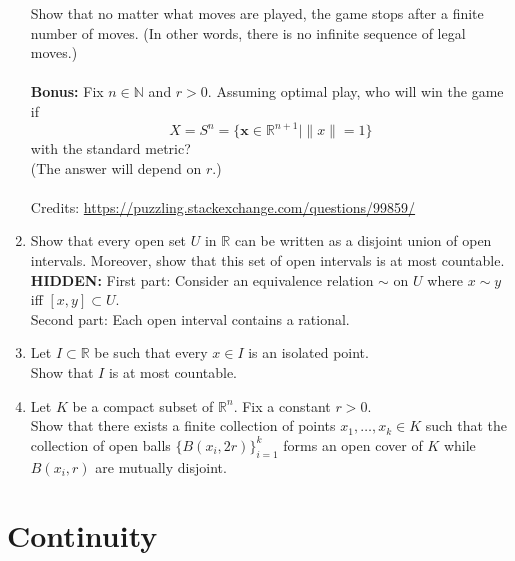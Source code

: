 \documentclass[12pt]{article}
\theoremstyle{definition}
\numberwithin{thm}{section}
\newcommand{\hint}[1]{\textbf{HIDDEN:} {\color[rgb]{0.95, 0.95, 0.95}#1}}
\begin{document}
\begin{enumerate}
	Show that no matter what moves are played, the game stops after a finite number of moves. (In other words, there is no infinite sequence of legal moves.)\\~\\
	\textbf{Bonus:} Fix $n \in \mathbb{N}$ and $r > 0.$ Assuming optimal play, who will win the game if
	\begin{equation*} 
		X = S^n = \{\mathbf{x} \in \mathbb{R}^{n+1} \mid \|x\| = 1\}
	\end{equation*}
	with the standard metric?\\
	(The answer will depend on $r$.)\\~\\
	Credits: \url{https://puzzling.stackexchange.com/questions/99859/}
	\item Show that every open set $U$ in $\mathbb{R}$ can be written as a disjoint union of open intervals. Moreover, show that this set of open intervals is at most countable.\\
	\hint{First part: Consider an equivalence relation $\sim$ on $U$ where $x \sim y$ iff $[x, y] \subset U.$\\
	Second part: Each open interval contains a rational.}
	\item Let $I \subset \mathbb{R}$ be such that every $x \in I$ is an isolated point.\\
	Show that $I$ is at most countable.
	\item Let $K$ be a compact subset of $\mathbb{R}^n$. Fix a constant $r>0.$ \\
	Show that there exists a finite collection of points $x_1, \ldots, x_k\in K$ such that the collection of open balls $\{B(x_i,2r)\}_{i=1}^k$ forms an open cover of $K$ while $B(x_i, r)$ are mutually disjoint.
\end{enumerate}
\newpage\section{Continuity}
\end{document}
